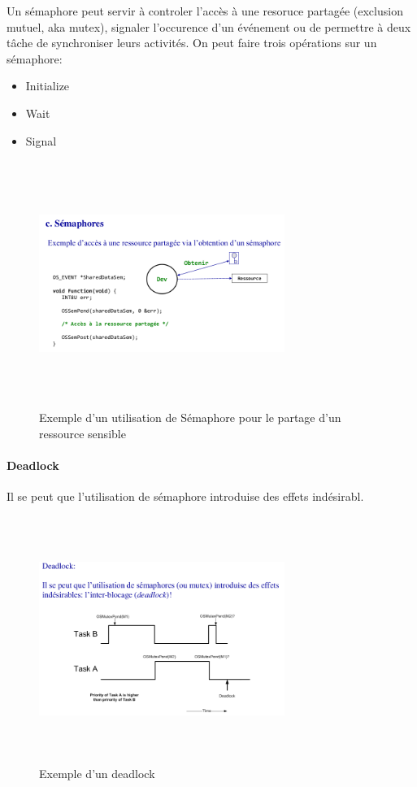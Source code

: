 \documentclass[oneside]{book}
\begin{document}
    Un sémaphore peut servir à controler l'accès à une resoruce partagée (exclusion mutuel, aka mutex), signaler l'occurence d'un événement ou de permettre à deux tâche de synchroniser leurs activités. On peut faire trois opérations sur un sémaphore:
    \begin{itemize}
        \item Initialize
        \item Wait
        \item Signal
    \end{itemize} 

    \begin{figure}[!ht]
    	\centering
    	\includegraphics[width=8cm, height = 8cm, keepaspectratio]{Images/semaphore_ressource.png}
    	\caption{Exemple d'un utilisation de Sémaphore pour le partage d'un ressource sensible}
    	\label{fig:SemaphoreRessource}
    \end{figure}
    
    \paragraph{Deadlock} Il se peut que l'utilisation de sémaphore introduise des effets indésirabl.\\
    
    \begin{figure}[!ht]
    	\centering
    	\includegraphics[width=8cm, height = 8cm, keepaspectratio]{Images/deadlock.png}
    	\caption{Exemple d'un deadlock}
    	\label{fig:Deadlock}
    \end{figure}
    
\end{document}
